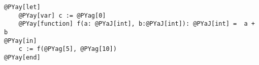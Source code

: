 \begin{Verbatim}[commandchars=@\[\]]
@PYay[let] 
    @PYay[var] c := @PYag[0]
    @PYay[function] f(a: @PYaJ[int], b:@PYaJ[int]): @PYaJ[int] =  a + b
@PYay[in]
    c := f(@PYag[5], @PYag[10])
@PYay[end]
\end{Verbatim}
